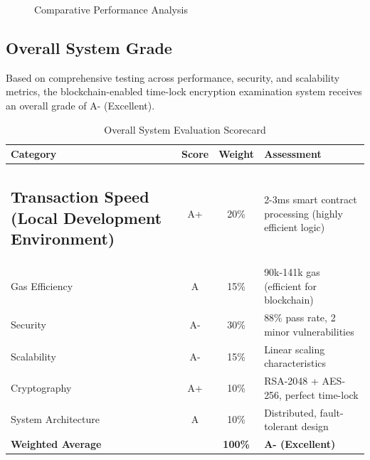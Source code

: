 \documentclass[12pt,a4paper]{article}
\begin{document}
\begin{figure}[H]
    \centering
    \caption{Comparative Performance Analysis}
    \label{fig:comparison}
\end{figure}

\subsection{Overall System Grade}

Based on comprehensive testing across performance, security, and scalability metrics, the blockchain-enabled time-lock encryption examination system receives an overall grade of A- (Excellent).

\begin{table}[H]
\centering
\caption{Overall System Evaluation Scorecard}
\label{tab:system-grade}
\begin{tabular}{lccp{6cm}}
\toprule
\textbf{Category} & \textbf{Score} & \textbf{Weight} & \textbf{Assessment} \\
\midrule
\subsection{Transaction Speed (Local Development Environment)} & A+ & 20\% & 2-3ms smart contract processing (highly efficient logic) \\
Gas Efficiency & A & 15\% & 90k-141k gas (efficient for blockchain) \\
Security & A- & 30\% & 88\% pass rate, 2 minor vulnerabilities \\
Scalability & A- & 15\% & Linear scaling characteristics \\
Cryptography & A+ & 10\% & RSA-2048 + AES-256, perfect time-lock \\
System Architecture & A & 10\% & Distributed, fault-tolerant design \\
\midrule
\multicolumn{2}{l}{\textbf{Weighted Average}} & \textbf{100\%} & \textbf{A- (Excellent)} \\
\bottomrule
\end{tabular}
\end{table}
\end{document}
